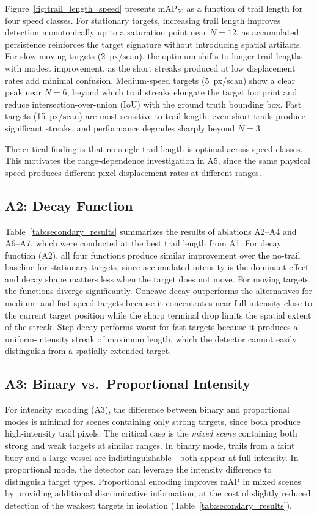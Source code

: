 \documentclass[twocolumn, 10pt]{article}
\begin{document}
Figure~\ref{fig:trail_length_speed} presents mAP$_{50}$ as a function of trail length for four speed classes. For stationary targets, increasing trail length improves detection monotonically up to a saturation point near $N=12$, as accumulated persistence reinforces the target signature without introducing spatial artifacts. For slow-moving targets (2~px/scan), the optimum shifts to longer trail lengths with modest improvement, as the short streaks produced at low displacement rates add minimal confusion. Medium-speed targets (5~px/scan) show a clear peak near $N=6$, beyond which trail streaks elongate the target footprint and reduce intersection-over-union (IoU) with the ground truth bounding box. Fast targets (15~px/scan) are most sensitive to trail length: even short trails produce significant streaks, and performance degrades sharply beyond $N=3$.

The critical finding is that no single trail length is optimal across speed classes. This motivates the range-dependence investigation in A5, since the same physical speed produces different pixel displacement rates at different ranges.

\subsection{A2: Decay Function}

Table~\ref{tab:secondary_results} summarizes the results of ablations A2--A4 and A6--A7, which were conducted at the best trail length from A1. For decay function (A2), all four functions produce similar improvement over the no-trail baseline for stationary targets, since accumulated intensity is the dominant effect and decay shape matters less when the target does not move. For moving targets, the functions diverge significantly. Concave decay outperforms the alternatives for medium- and fast-speed targets because it concentrates near-full intensity close to the current target position while the sharp terminal drop limits the spatial extent of the streak. Step decay performs worst for fast targets because it produces a uniform-intensity streak of maximum length, which the detector cannot easily distinguish from a spatially extended target.

\subsection{A3: Binary vs.\ Proportional Intensity}

For intensity encoding (A3), the difference between binary and proportional modes is minimal for scenes containing only strong targets, since both produce high-intensity trail pixels. The critical case is the \textit{mixed scene} containing both strong and weak targets at similar ranges. In binary mode, trails from a faint buoy and a large vessel are indistinguishable---both appear at full intensity. In proportional mode, the detector can leverage the intensity difference to distinguish target types. Proportional encoding improves mAP in mixed scenes by providing additional discriminative information, at the cost of slightly reduced detection of the weakest targets in isolation (Table~\ref{tab:secondary_results}).
\end{document}
